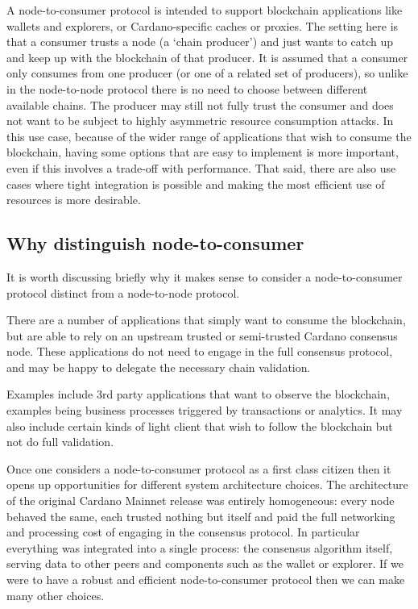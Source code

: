 \documentclass{article}
\theoremstyle{definition}{
  \newtheorem{lemma}{Lemma}[section] %
  \newtheorem{definition}[lemma]{Definition}
}
\theoremstyle{theorem}{
  \newtheorem{invariant}[lemma]{Invariant}
  \newtheorem{proofobligation}[lemma]{Proof Obligation}
}
\numberwithin{equation}{lemma}
\begin{document}
A node-to-consumer protocol is intended to support blockchain applications
like wallets and explorers, or Cardano-specific caches or proxies. The setting
here is that a consumer trusts a node (a `chain producer') and just wants to
catch up and keep up with the blockchain of that producer. It is assumed that
a consumer only consumes from one producer (or one of a related set of
producers), so unlike in the node-to-node protocol there is no need to choose
between different available chains. The producer may still not fully trust the
consumer and does not want to be subject to highly asymmetric resource
consumption attacks. In this use case, because of the wider range of
applications that wish to consume the blockchain, having some options that are
easy to implement is more important, even if this involves a trade-off with
performance. That said, there are also use cases where tight integration is
possible and making the most efficient use of resources is more desirable.

\subsection{Why distinguish node-to-consumer}

It is worth discussing briefly why it makes sense to consider a node-to-consumer
protocol distinct from a node-to-node protocol.

There are a number of applications that simply want to consume the blockchain,
but are able to rely on an upstream trusted or semi-trusted Cardano consensus
node. These applications do not need to engage in the full consensus protocol,
and may be happy to delegate the necessary chain validation.

Examples include 3rd party applications that want to observe the blockchain,
examples being business processes triggered by transactions or analytics.  It
may also include certain kinds of light client that wish to follow the
blockchain but not do full validation.

Once one considers a node-to-consumer protocol as a first class citizen then it
opens up opportunities for different system architecture choices. The
architecture of the original Cardano Mainnet release was entirely homogeneous:
every node behaved the same, each trusted nothing but itself and paid the full
networking and processing cost of engaging in the consensus protocol.  In
particular everything was integrated into a single process: the consensus
algorithm itself, serving data to other peers and components such as the wallet
or explorer. If we were to have a robust and efficient node-to-consumer protocol
then we can make many other choices.
\end{document}
